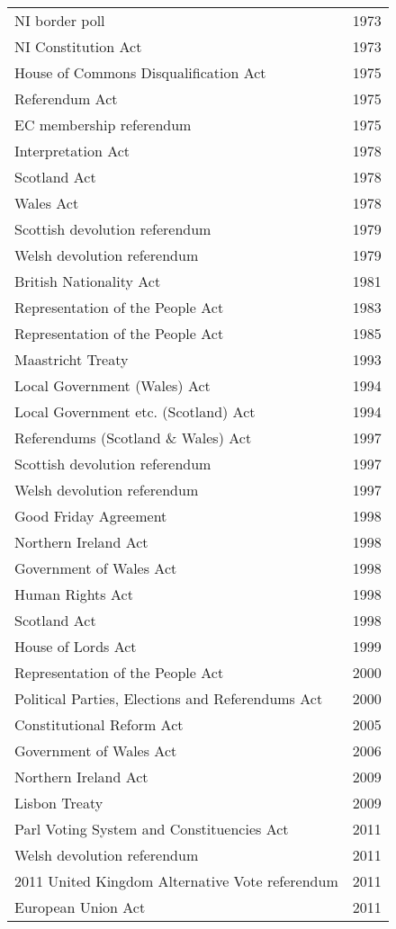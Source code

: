 \documentclass[14pt,titlepage]{extarticle}
\begin{document}
{\begin{longtable}{l l}
NI border poll & 1973\\
NI Constitution Act & 1973\\
House of Commons Disqualification Act & 1975\\
Referendum Act & 1975\\
EC membership referendum & 1975\\
Interpretation Act & 1978\\
Scotland Act  & 1978\\
Wales Act  & 1978\\
Scottish devolution referendum & 1979\\
Welsh devolution referendum & 1979\\
British Nationality Act  & 1981\\
Representation of the People Act  & 1983\\
Representation of the People Act  & 1985\\
Maastricht Treaty & 1993\\
Local Government (Wales) Act & 1994\\
Local Government etc. (Scotland) Act & 1994\\
Referendums (Scotland \& Wales) Act & 1997\\
Scottish devolution referendum & 1997\\
Welsh devolution referendum & 1997\\
Good Friday Agreement & 1998\\
Northern Ireland Act & 1998\\
Government of Wales Act & 1998\\
Human Rights Act & 1998\\
Scotland Act & 1998\\
House of Lords Act & 1999\\
Representation of the People Act  & 2000\\
Political Parties, Elections and Referendums Act & 2000\\
Constitutional Reform Act & 2005\\
Government of Wales Act  & 2006\\
Northern Ireland Act  & 2009\\
Lisbon Treaty & 2009\\
Parl Voting System and Constituencies Act & 2011\\
Welsh devolution referendum & 2011\\
2011 United Kingdom Alternative Vote referendum & 2011\\
European Union Act &  2011\\

\end{longtable}}
\end{document}
